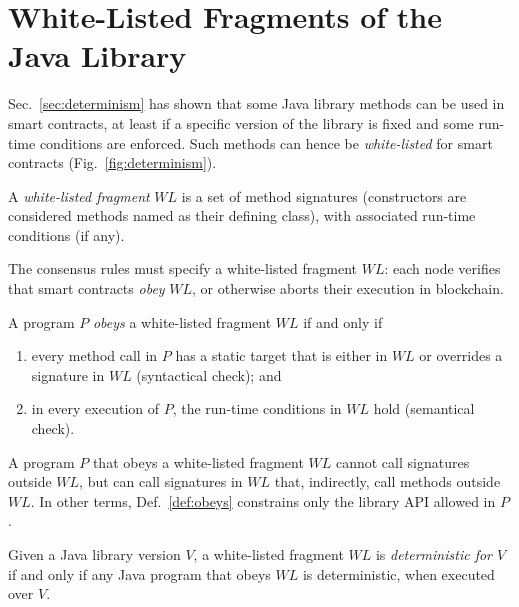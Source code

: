 \section{White-Listed Fragments of the Java Library}\label{sec:white_listing}

\newcommand{\wl}{\mathit{WL}}

Sec.~\ref{sec:determinism} has shown that some Java library methods can be used
in smart contracts, at least if a specific version of the library is fixed and some
run-time conditions are enforced. Such methods can hence be \emph{white-listed} for smart contracts
(Fig.~\ref{fig:determinism}).

\begin{definition}\label{def:white-listing}
  A \emph{white-listed fragment} $\wl$ is a set of method signatures (constructors are considered
  methods named as their defining class), with associated run-time conditions (if any).
\end{definition}
%
The consensus rules must specify a white-listed fragment $\wl$:
each node verifies that smart contracts \emph{obey} $\wl$,
or otherwise aborts their execution in blockchain.
%
\begin{definition}\label{def:obeys}
  A program $P$ \emph{obeys} a white-listed fragment $\wl$ if and only if
  \begin{enumerate}
    \item every method call
      in $P$ has a static target that is either in $\wl$ or overrides a signature in $\wl$
      (syntactical check); and
    \item in every execution of $P$, the run-time conditions in $\wl$ hold (semantical check).
  \end{enumerate}
\end{definition}
%
A program $P$ that obeys a white-listed fragment $\wl$ cannot call signatures outside
$\wl$, but can call signatures in $\wl$ that, indirectly, call methods outside $\wl$.
In other terms, Def.~\ref{def:obeys} constrains only the library API allowed in $P$.
%
\begin{definition}\label{def:deterministic}
  Given a Java library version $V$, a white-listed fragment $\wl$ is
  \emph{deterministic for $V$}
  if and only if any Java program that obeys $\wl$
  is deterministic, when executed over $V$.
\end{definition}

